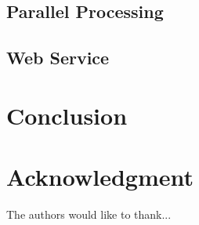 \documentclass[conference]{IEEEtran}
\begin{document}
\subsection{Parallel Processing}
\blindtext

\subsection{Web Service}
\blindtext


\section{Conclusion}
\blindtext 


\section*{Acknowledgment}
The authors would like to thank...

\ifCLASSOPTIONcaptionsoff
  \newpage
\fi




\end{document}
